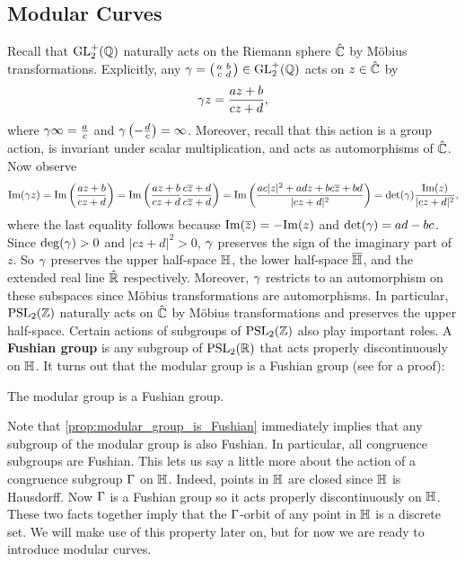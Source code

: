     \subsection*{Modular Curves}
      Recall that $\mathrm{GL}_{2}^{+}(\mathbb{Q})$ naturally acts on the Riemann sphere $\hat{\mathbb{C}}$ by M\"obius transformations. Explicitly, any $\gamma = \begin{psmallmatrix} a & b \\ c & d \end{psmallmatrix} \in \mathrm{GL}_{2}^{+}(\mathbb{Q})$ acts on $z \in \hat{\mathbb{C}}$ by
      \[
        \gamma z = \frac{az+b}{cz+d},
      \]
      where $\gamma \infty = \frac{a}{c}$ and $\gamma\left(-\frac{d}{c}\right) = \infty$. Moreover, recall that this action is a group action, is invariant under scalar multiplication, and acts as automorphisms of $\hat{\mathbb{C}}$. Now observe
      \[
        \mathrm{Im}(\gamma z) = \mathrm{Im}\left(\frac{az+b}{cz+d}\right) = \mathrm{Im}\left(\frac{az+b}{cz+d}\frac{c\overline{z}+d}{c\overline{z}+d}\right) = \mathrm{Im}\left(\frac{ac|z|^{2}+adz+bc\overline{z}+bd}{|cz+d|^{2}}\right) = \det(\gamma)\frac{\mathrm{Im}(z)}{|cz+d|^{2}},
      \]
      where the last equality follows because $\mathrm{Im}(\overline{z}) = -\mathrm{Im}(z)$ and $\det(\gamma) = ad-bc$. Since $\deg(\gamma) > 0$ and $|cz+d|^{2} > 0$, $\gamma$ preserves the sign of the imaginary part of $z$. So $\gamma$ preserves the upper half-space $\mathbb{H}$, the lower half-space $\overline{\mathbb{H}}$, and the extended real line $\hat{\mathbb{R}}$ respectively. Moreover, $\gamma$ restricts to an automorphism on these subspaces since M\"obius transformations are automorphisms. In particular, $\mathrm{PSL}_{2}(\mathbb{Z})$ naturally acts on $\hat{\mathbb{C}}$ by M\"obius transformations and preserves the upper half-space. Certain actions of subgroups of $\mathrm{PSL}_{2}(\mathbb{Z})$ also play important roles. A \textbf{Fushian group} is any subgroup of $\mathrm{PSL}_{2}(\mathbb{R})$ that acts properly discontinuously on $\mathbb{H}$. It turns out that the modular group is a Fushian group (see \cite{diamond2005first} for a proof):

      \begin{proposition}\label{prop:modular_group_is_Fushian}
        The modular group is a Fushian group.
      \end{proposition}

      Note that \cref{prop:modular_group_is_Fushian} immediately implies that any subgroup of the modular group is also Fushian. In particular, all congruence subgroups are Fushian. This lets us say a little more about the action of a congruence subgroup $\Gamma$ on $\mathbb{H}$. Indeed, points in $\mathbb{H}$ are closed since $\mathbb{H}$ is Hausdorff. Now $\Gamma$ is a Fushian group so it acts properly discontinuously on $\mathbb{H}$. These two facts together imply that the $\Gamma$-orbit of any point in $\mathbb{H}$ is a discrete set. We will make use of this property later on, but for now we are ready to introduce modular curves.

